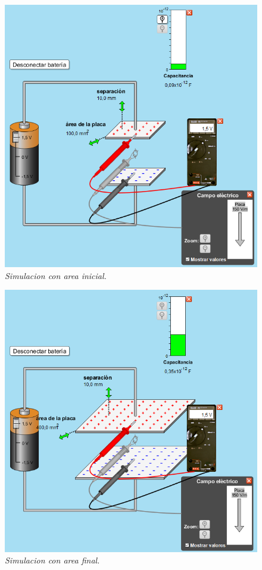 \documentclass[12pt]{report}
\begin{document}
\begin{enumerate}
    \begin{figure}[h]
        \centering
        \begin{minipage}[h]{0.4\textwidth}
        \centering
        \includegraphics[width=1\textwidth]{./images/2FOTO1.png}
        \textit{Simulacion con area inicial.} 
        \end{minipage}\hskip 1cm
        \begin{minipage}[h]{0.4\textwidth}
        \centering
        \includegraphics[width=1\textwidth]{./images/2FOTO2.png}
        \textit{Simulacion con area final.} 
     \end{minipage}
    \end{figure}


\end{enumerate}
\end{document}
